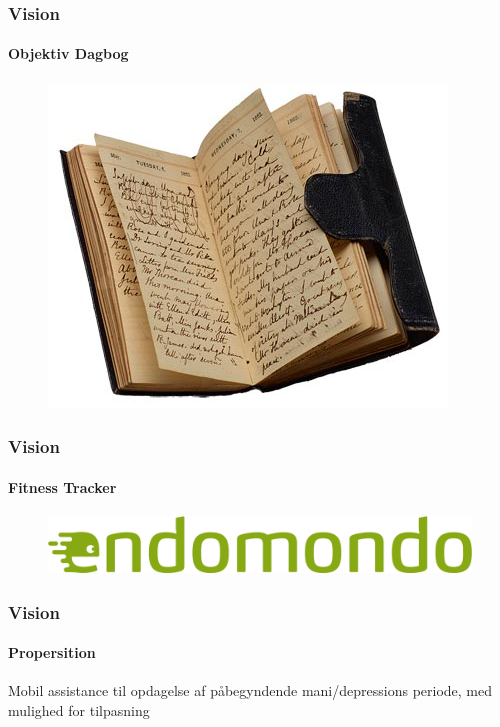 \begin{frame}
\frametitle{Vision}
\framesubtitle{Objektiv Dagbog}
\begin{figure}
	\includegraphics[scale=0.5]{graphics/diary}
\end{figure}
\end{frame}

\begin{frame}
\frametitle{Vision}
\framesubtitle{Fitness Tracker}
\begin{figure}
	\includegraphics[scale=0.3]{graphics/fitnesstracker}
\end{figure}
\end{frame}

\begin{frame}
\frametitle{Vision}
\framesubtitle{Propersition}
\begin{center}
Mobil assistance til opdagelse af påbegyndende mani/depressions periode, med mulighed for tilpasning
\end{center}
\end{frame}